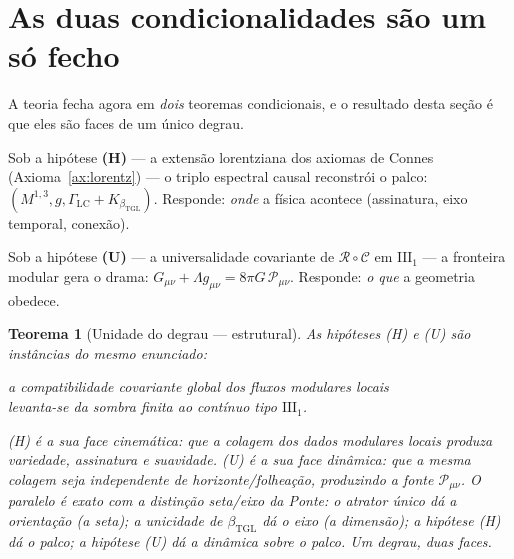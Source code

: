 \documentclass[11pt,a4paper]{article}
\newcommand{\bTGL}{\beta_{\mathrm{TGL}}}
\newtheorem{theorem}{Teorema}
\begin{document}
\section{As duas condicionalidades são um só fecho}\label{sec:doisfechos}
A teoria fecha agora em \emph{dois} teoremas condicionais, e o resultado
desta seção é que eles são faces de um único degrau.

\begin{description}[style=unboxed,leftmargin=1.5em]
\item[Fecho cinemático (a Ponte, Teorema~\ref{thm:cond}).] Sob a hipótese
\textbf{(H)} --- a extensão lorentziana dos axiomas de Connes
(Axioma~\ref{ax:lorentz}) --- o triplo espectral causal reconstrói o palco:
$(M^{1,3},g,\Gamma_{\mathrm{LC}}+K_{\bTGL})$. Responde: \emph{onde} a física
acontece (assinatura, eixo temporal, conexão).
\item[Fecho dinâmico (a Face C, Teorema~\ref{thm:faceC}).] Sob a hipótese
\textbf{(U)} --- a universalidade covariante de $\mathcal R\circ\mathcal C$
em $\mathrm{III}_1$ --- a fronteira modular gera o drama:
$G_{\mu\nu}+\Lambda g_{\mu\nu}=8\pi G\,\mathcal P_{\mu\nu}$. Responde:
\emph{o que} a geometria obedece.
\end{description}

\begin{theorem}[Unidade do degrau --- estrutural]\label{thm:degrau}
As hipóteses (H) e (U) são instâncias do mesmo enunciado:
\begin{center}
\emph{a compatibilidade covariante global dos fluxos modulares locais\\
levanta-se da sombra finita ao contínuo tipo $\mathrm{III}_1$.}
\end{center}
(H) é a sua face \emph{cinemática}: que a colagem dos dados modulares locais
produza variedade, assinatura e suavidade. (U) é a sua face \emph{dinâmica}:
que a mesma colagem seja independente de horizonte/folheação, produzindo a
fonte $\mathcal P_{\mu\nu}$. O paralelo é exato com a distinção
seta/eixo da Ponte: o atrator único dá a \emph{orientação} (a seta); a
unicidade de $\bTGL$ dá o \emph{eixo} (a dimensão); a hipótese (H) dá o
\emph{palco}; a hipótese (U) dá a \emph{dinâmica sobre o palco}. Um degrau,
duas faces.
\end{theorem}
\end{document}
